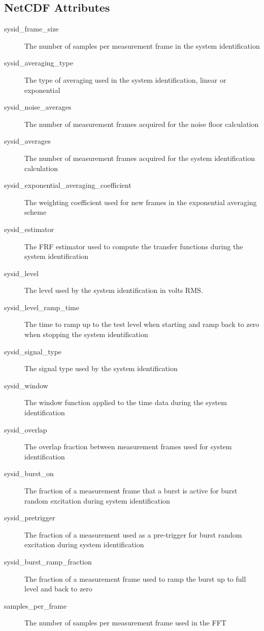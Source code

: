 \documentclass[pdf,12pt,report]{SANDreport}
\begin{document}
    \subsection{NetCDF Attributes}
    \begin{description}
        \item[sysid\_frame\_size] The number of samples per measurement frame in the system identification
        \item[sysid\_averaging\_type] The type of averaging used in the system identification, linear or exponential
        \item[sysid\_noise\_averages] The number of measurement frames acquired for the noise floor calculation
        \item[sysid\_averages] The number of measurement frames acquired for the system identification calculation
        \item[sysid\_exponential\_averaging\_coefficient] The weighting coefficient used for new frames in the exponential averaging scheme
        \item[sysid\_estimator] The \Ac{FRF} estimator used to compute the transfer functions during the system identification
        \item[sysid\_level] The level used by the system identification in volts RMS.
        \item[sysid\_level\_ramp\_time] The time to ramp up to the test level when starting and ramp back to zero when stopping the system identification
        \item[sysid\_signal\_type] The signal type used by the system identification
        \item[sysid\_window] The window function applied to the time data during the system identification
        \item[sysid\_overlap] The overlap fraction between measurement frames used for system identification
        \item[sysid\_burst\_on] The fraction of a measurement frame that a burst is active for burst random excitation during system identification
        \item[sysid\_pretrigger] The fraction of a measurement used as a pre-trigger for burst random excitation during system identification
        \item[sysid\_burst\_ramp\_fraction] The fraction of a measurement frame used to ramp the burst up to full level and back to zero
        \item[samples\_per\_frame] The number of samples per measurement frame used in the \ac{FFT}

\end{description}
\end{document}
